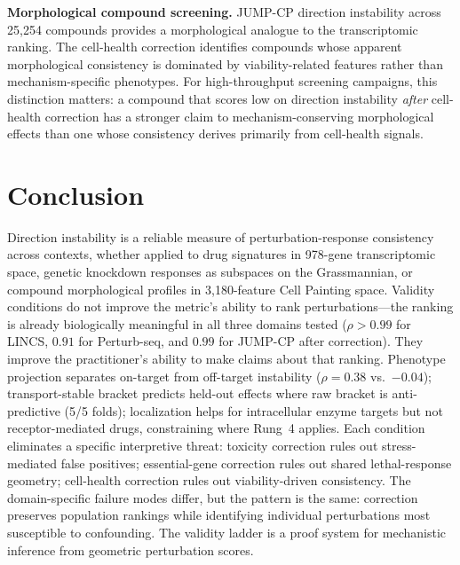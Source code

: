 \documentclass{article}
\begin{document}
\textbf{Morphological compound screening.} JUMP-CP direction instability
across 25{,}254 compounds provides a morphological analogue to the
transcriptomic ranking. The cell-health correction identifies compounds
whose apparent morphological consistency is dominated by viability-related
features rather than mechanism-specific phenotypes. For high-throughput
screening campaigns, this distinction matters: a compound that scores low
on direction instability \emph{after} cell-health correction has a stronger
claim to mechanism-conserving morphological effects than one whose
consistency derives primarily from cell-health signals.

\section{Conclusion}

Direction instability is a reliable measure of perturbation-response
consistency across contexts, whether applied to drug signatures in 978-gene
transcriptomic space, genetic knockdown responses as subspaces on the
Grassmannian, or compound morphological profiles in 3{,}180-feature Cell
Painting space. Validity conditions do not improve the metric's ability to
rank perturbations---the ranking is already biologically meaningful in all
three domains tested ($\rho > 0.99$ for LINCS, $0.91$ for Perturb-seq,
and $0.99$ for JUMP-CP after correction).
They improve the practitioner's ability to make claims about that ranking.
Phenotype projection separates on-target from off-target instability
($\rho = 0.38$ vs.\ $-0.04$); transport-stable bracket predicts held-out
effects where raw bracket is anti-predictive (5/5 folds); localization
helps for intracellular enzyme targets but not receptor-mediated drugs,
constraining where Rung~4 applies. Each condition eliminates a specific
interpretive threat: toxicity correction rules out stress-mediated false
positives; essential-gene correction rules out shared lethal-response
geometry; cell-health correction rules out viability-driven consistency.
The domain-specific failure modes differ, but the pattern is the same:
correction preserves population rankings while identifying individual
perturbations most susceptible to confounding. The validity ladder is a
proof system for mechanistic inference from geometric perturbation scores.



\end{document}
